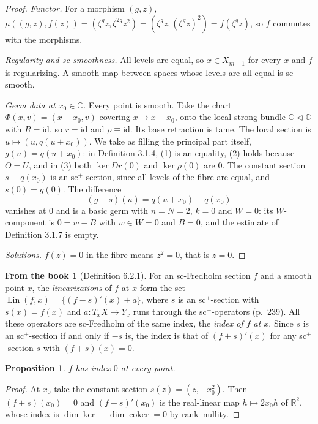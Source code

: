 \documentclass[11pt,a4paper]{article}
\theoremstyle{plain}
\newtheorem{proposition}[theorem]{Proposition}
\theoremstyle{definition}
\newtheorem{recall}[theorem]{From the book}
\theoremstyle{remark}
\newcommand{\C}{\mathbb{C}}
\newcommand{\R}{\mathbb{R}}
\newcommand{\Lin}{\operatorname{Lin}}
\newcommand{\id}{\mathrm{id}}
\newcommand{\coker}{\operatorname{coker}}
\begin{document}
\begin{proof}
\emph{Functor.} For a morphism $(g,z)$,
$\mu((g,z),f(z))=(\zeta^g z,\zeta^{2g}z^2)=(\zeta^g z,(\zeta^g z)^2)=f(\zeta^g z)$, so $f$ commutes
with the morphisms.

\emph{Regularity and sc-smoothness.} All levels are equal, so $x\in X_{m+1}$ for every $x$ and $f$ is
regularizing. A smooth map between spaces whose levels are all equal is sc-smooth.

\emph{Germ data at $x_0\in\C$.} Every point is smooth. Take the chart $\Phi(x,v)=(x-x_0,v)$ covering
$x\mapsto x-x_0$, onto the local strong bundle $\C\triangleleft\C$ with $R=\id$, so $r=\id$ and
$\rho\equiv\id$. Its base retraction is tame. The local section is $u\mapsto(u,q(u+x_0))$. We take as
filling the principal part itself, $g(u)=q(u+x_0)$: in Definition 3.1.4, (1) is an equality, (2) holds
because $O=U$, and in (3) both $\ker Dr(0)$ and $\ker\rho(0)$ are $0$. The constant section
$s\equiv q(x_0)$ is an sc$^+$-section, since all levels of the fibre are equal, and $s(0)=g(0)$. The
difference
\[
  (g-s)(u)=q(u+x_0)-q(x_0)
\]
vanishes at $0$ and is a basic germ with $n=N=2$, $k=0$ and $W=0$: its $W$-component is $0=w-B$ with
$w\in W=0$ and $B=0$, and the estimate of Definition 3.1.7 is empty.

\emph{Solutions.} $f(z)=0$ in the fibre means $z^2=0$, that is $z=0$.
\end{proof}

\begin{recall}[Definition 6.2.1]\label{rec:index}
For an sc-Fredholm section $f$ and a smooth point $x$, the \emph{linearizations} of $f$ at $x$ form the
set $\Lin(f,x)=\{(f-s)'(x)+a\}$, where $s$ is an sc$^+$-section with $s(x)=f(x)$ and $a\colon
T_xX\to Y_x$ runs through the sc$^+$-operators (p.~239). All these operators are sc-Fredholm of the
same index, the \emph{index of $f$ at $x$}. Since $s$ is an sc$^+$-section if and only if $-s$ is, the
index is that of $(f+s)'(x)$ for any sc$^+$-section $s$ with $(f+s)(x)=0$.
\end{recall}

\begin{proposition}\label{prop:index}
$f$ has index $0$ at every point.
\end{proposition}

\begin{proof}
At $x_0$ take the constant section $s(z)=(z,-x_0^2)$. Then $(f+s)(x_0)=0$ and $(f+s)'(x_0)$ is the
real-linear map $h\mapsto 2x_0h$ of $\R^2$, whose index is $\dim\ker-\dim\coker=0$ by rank--nullity.
\end{proof}
\end{document}

